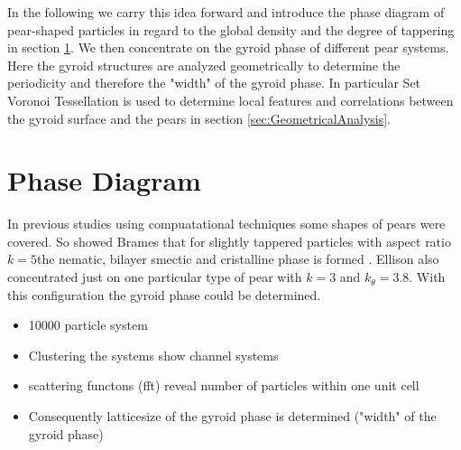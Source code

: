\documentclass[epj,twocolumn]{webofc}
\begin{document}
In the following we carry this idea forward and introduce the phase diagram of pear-shaped particles in regard to the global density and the degree of tappering in section \ref{sec:PhaseDiagram}. We then concentrate on the gyroid phase
of different pear systems. Here the gyroid structures are analyzed geometrically to determine the periodicity and therefore the "width" of the gyroid phase. In particular Set Voronoi Tessellation is used to determine local features
and correlations between the gyroid surface and the pears in section \ref{sec:GeometricalAnalysis}.
%



\section{Phase Diagram}
\label{sec:PhaseDiagram}

In previous studies using compuatational techniques some shapes of pears were covered. So showed Brames that for slightly tappered particles with aspect ratio $k=5$the nematic, bilayer smectic and cristalline phase is formed \cite{}.
Ellison also concentrated just on one particular type of pear with $k=3$ and $k_{\theta}=3.8$. With this configuration the gyroid phase could be determined. 
\begin{itemize}
    \item 10000 particle system
    \item Clustering the systems show channel systems
    \item scattering functons (fft) reveal number of particles within one unit cell
    \item Consequently latticesize of the gyroid phase is determined ("width" of the gyroid phase)
\end{itemize}
\end{document}
